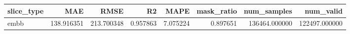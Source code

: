 \begin{tabular}{lrrrrrrr}
\toprule
slice_type & MAE & RMSE & R2 & MAPE & mask_ratio & num_samples & num_valid \\
\midrule
embb & 138.916351 & 213.700348 & 0.957863 & 7.075224 & 0.897651 & 136464.000000 & 122497.000000 \\
\bottomrule
\end{tabular}
